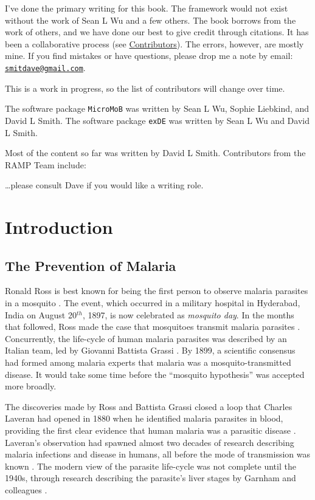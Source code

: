 \documentclass[
]{book}
\begin{document}
I've done the primary writing for this book. The framework would not exist without the work of Sean L Wu and a few others. The book borrows from the work of others, and we have done our best to give credit through citations. It has been a collaborative process (see \hyperref[contributors]{Contributors}). The errors, however, are mostly mine. If you find mistakes or have questions, please drop me a note by email: \href{mailto:smitdave@gmail.com}{\nolinkurl{smitdave@gmail.com}}.

This is a work in progress, so the list of contributors will change over time.

The software package \texttt{MicroMoB} was written by Sean L Wu, Sophie Liebkind, and David L Smith. The software package \texttt{exDE} was written by Sean L Wu and David L Smith.

Most of the content so far was written by David L Smith. Contributors from the RAMP Team include:

\ldots please consult Dave if you would like a writing role.

\part{Introduction}\label{part-introduction}

\chapter{The Prevention of Malaria}\label{the-prevention-of-malaria}

Ronald Ross is best known for being the first person to observe malaria parasites in a mosquito \autocite{RossR1897PeculiarPigmented}. The event, which occurred in a military hospital in Hyderabad, India on August 20\(^{th}\), 1897, is now celebrated as \emph{mosquito day}.
In the months that followed, Ross made the case that mosquitoes transmit malaria parasites \autocite{RossR1898RoleMosquito}.
Concurrently, the life-cycle of human malaria parasites was described by an Italian team, led by Giovanni Battista Grassi \autocite{GrassiB1898UlterioriRicerche,GrassiB1901StudiDi}.
By 1899, a scientific consensus had formed among malaria experts that malaria was a mosquito-transmitted disease.
It would take some time before the ``mosquito hypothesis'' was accepted more broadly.

The discoveries made by Ross and Battista Grassi closed a loop that Charles Laveran had opened in 1880 when he identified malaria parasites in blood, providing the first clear evidence that human malaria was a parasitic disease \autocite{Laveran1880,Laveran1884}.
Laveran's observation had spawned almost two decades of research describing malaria infections and disease in humans, all before the mode of transmission was known \autocite{GarnhamPCC1988HistoryDiscoveries}.
The modern view of the parasite life-cycle was not complete until the 1940s, through research describing the parasite's liver stages by Garnham and colleagues \autocite{ShorttHE1948PreerythrocyticStage,GarnhamPCC1988HistoryDiscoveries}.
\end{document}

